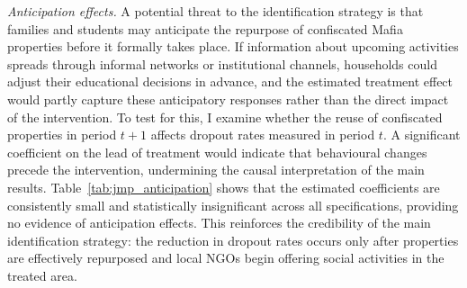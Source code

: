 \documentclass[12pt]{article}
\theoremstyle{plain}
\theoremstyle{plain}
\theoremstyle{plain}
\theoremstyle{definition}
\theoremstyle{plain}
\theoremstyle{definition}
\theoremstyle{plain}
\theoremstyle{remark}
\theoremstyle{definition}
\theoremstyle{definition}
\theoremstyle{plain}
\begin{document}
\emph{Anticipation effects.} A potential threat to the identification strategy is that families and students may anticipate the repurpose of confiscated Mafia properties before it formally takes place. If information about upcoming activities spreads through informal networks or institutional channels, households could adjust their educational decisions in advance, and the estimated treatment effect would partly capture these anticipatory responses rather than the direct impact of the intervention. To test for this, I examine whether the reuse of confiscated properties in period $t+1$ affects dropout rates measured in period $t$. A significant coefficient on the lead of treatment would indicate that behavioural changes precede the intervention, undermining the causal interpretation of the main results. Table~\ref{tab:jmp_anticipation} shows that the estimated coefficients are consistently small and statistically insignificant across all specifications, providing no evidence of anticipation effects. This reinforces the credibility of the main identification strategy: the reduction in dropout rates occurs only after properties are effectively repurposed and local NGOs begin offering social activities in the treated area.\par
\end{document}

